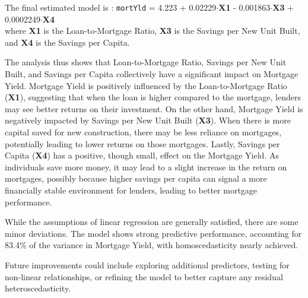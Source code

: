 \documentclass[
  11pt,
]{article}
\begin{document}
\hfill\break
The final estimated model is : \texttt{mortYld} = 4.223 +
0.02229\(\cdot\)\textbf{X1} - 0.001863\(\cdot\)\textbf{X3} +
0.0002249\(\cdot\)\textbf{X4}\\
where \textbf{X1} is the Loan-to-Mortgage Ratio, \textbf{X3} is the
Savings per New Unit Built, and \textbf{X4} is the Savings per Capita.

The analysis thus shows that Loan-to-Mortgage Ratio, Savings per New
Unit Built, and Savings per Capita collectively have a significant
impact on Mortgage Yield. Mortgage Yield is positively influenced by the
Loan-to-Mortgage Ratio (\textbf{X1}), suggesting that when the loan is
higher compared to the mortgage, lenders may see better returns on their
investment. On the other hand, Mortgage Yield is negatively impacted by
Savings per New Unit Built (\textbf{X3}). When there is more capital
saved for new construction, there may be less reliance on mortgages,
potentially leading to lower returns on those mortgages. Lastly, Savings
per Capita (\textbf{X4}) has a positive, though small, effect on the
Mortgage Yield. As individuals save more money, it may lead to a slight
increase in the return on mortgages, possibly because higher savings per
capita can signal a more financially stable environment for lenders,
leading to better mortgage performance.

While the assumptions of linear regression are generally satisfied,
there are some minor deviations. The model shows strong predictive
performance, accounting for 83.4\% of the variance in Mortgage Yield,
with homoscedasticity nearly achieved.

Future improvements could include exploring additional predictors,
testing for non-linear relationships, or refining the model to better
capture any residual heteroscedasticity.
\end{document}
